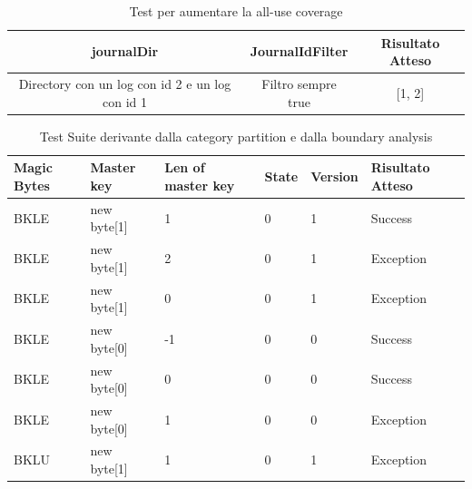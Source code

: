 \documentclass[12pt, a4paper]{article}
\begin{document}
  \begin{table}[ht]
    \centering
    \caption[Journal: Test Suite - Adequacy Data Flow 1]{Test per aumentare la all-use coverage}
    \begin{tabular}{|c|c|c|}
      \hline
      journalDir & JournalIdFilter & Risultato Atteso \\
      \hline
      {Directory con un log con id 2 e un log con id 1} & {Filtro sempre true} & [1, 2] \\
      \hline
    \end{tabular}
    \label{tab:ADF2ListJournalIds}
  \end{table}


\begin{table}[ht]
  \centering
  \caption[FileInfo: Test Suite - Category Partition]{Test Suite derivante dalla category partition e dalla boundary analysis}
  \begin{tabular}{|l|l|l|l|l|l|}
    \hline
    \textbf{Magic Bytes} & \textbf{Master key} & \textbf{Len of master key}  & \textbf{State} & \textbf{Version} & \textbf{Risultato Atteso} \\
    \hline
    BKLE & new byte[1] & 1 & 0 & 1 & Success \\
    BKLE & new byte[1] & 2 & 0 & 1 & Exception \\
    BKLE & new byte[1] & 0 & 0 & 1 & Exception \\
    BKLE & new byte[0] & -1 & 0 & 0 & Success \\
    BKLE & new byte[0] & 0 & 0 & 0 & Success \\
    BKLE & new byte[0] & 1 & 0 & 0 & Exception \\
    BKLU & new byte[1] & 1 & 0 & 1 & Exception \\
    \hline
  \end{tabular}
  \label{tab:categoryPartition1ReadHeader}
\end{table}
\end{document}
